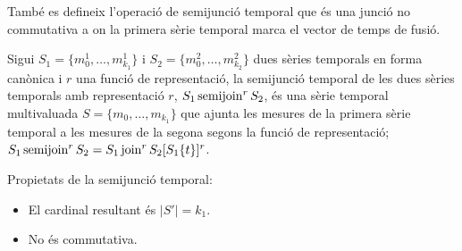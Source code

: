 També es defineix l'operació de semijunció temporal que és una junció
no commutativa a on la primera sèrie temporal marca el vector de temps
de fusió.

\begin{definition}
  Sigui $S_1=\{m_0^1, \dotsc, m_{k_1}^1\}$ i $S_2=\{m_0^2, \dotsc,
  m_{k_2}^2\}$ dues sèries temporals en forma canònica i $r$ una
  funció de representació, la semijunció temporal de les dues sèries
  temporals amb representació $r$, $S_1 \operatorname*{semijoin}^r S_2$, és una sèrie
  temporal multivaluada $S=\{m_0, \dotsc, m_{k_1}\}$ que ajunta les
  mesures de la primera sèrie temporal a les mesures de la segona
  segons la funció de representació; $S_1 \operatorname*{semijoin}^r S_2 = S_1
  \operatorname*{join}^r S_2[S_1\{t\}]^r$.
\end{definition}


Propietats de la semijunció temporal:
\begin{itemize}
\item El cardinal resultant és $|S'| = k_1$.
\item No és commutativa.
\end{itemize}

















